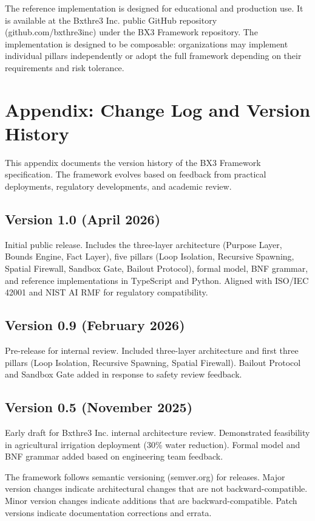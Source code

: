 \documentclass[12pt]{article}
\begin{document}
The reference implementation is designed for educational and production use. It is available at the Bxthre3 Inc. public GitHub repository (github.com/bxthre3inc) under the BX3 Framework repository. The implementation is designed to be composable: organizations may implement individual pillars independently or adopt the full framework depending on their requirements and risk tolerance.

\section{Appendix: Change Log and Version History}
This appendix documents the version history of the BX3 Framework specification. The framework evolves based on feedback from practical deployments, regulatory developments, and academic review.

\subsection{Version 1.0 (April 2026)}
Initial public release. Includes the three-layer architecture (Purpose Layer, Bounds Engine, Fact Layer), five pillars (Loop Isolation, Recursive Spawning, Spatial Firewall, Sandbox Gate, Bailout Protocol), formal model, BNF grammar, and reference implementations in TypeScript and Python. Aligned with ISO/IEC 42001 and NIST AI RMF for regulatory compatibility.

\subsection{Version 0.9 (February 2026)}
Pre-release for internal review. Included three-layer architecture and first three pillars (Loop Isolation, Recursive Spawning, Spatial Firewall). Bailout Protocol and Sandbox Gate added in response to safety review feedback.

\subsection{Version 0.5 (November 2025)}
Early draft for Bxthre3 Inc. internal architecture review. Demonstrated feasibility in agricultural irrigation deployment (30\% water reduction). Formal model and BNF grammar added based on engineering team feedback.

The framework follows semantic versioning (semver.org) for releases. Major version changes indicate architectural changes that are not backward-compatible. Minor version changes indicate additions that are backward-compatible. Patch versions indicate documentation corrections and errata.
\end{document}
